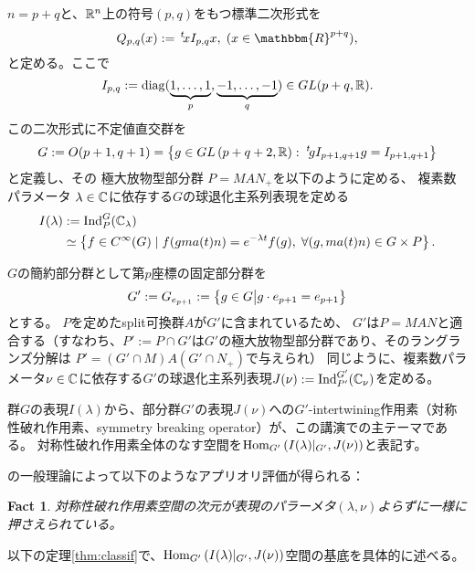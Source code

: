 \documentclass[12pt]{article} %
\newcommand{\assign}{:=}
\newcommand{\tmop}[1]{\ensuremath{\operatorname{#1}}}
\newcommand{\Hom}{\mbox{\normalfont Hom}}
\newcommand{\Ind}{\mbox{\normalfont Ind}}
\newtheorem{fact}{Fact}
\theoremstyle{definition}
\theoremstyle{exampstyle} \newtheorem{examp}[theorem]{Theorem}
\renewcommand{\Q}{Q_{p,q}}
\newcommand{\IlambdaGprime}{I(\lambda)\kern-0.3em\mid_{G'}}
\newcommand{\SBO}{\Hom_{G'}\left(\IlambdaGprime,J(\nu) \right)}
\newcommand{\doubt}[1]{\uwave{#1}}
\begin{document}
  \begin{versiona}
	  $n=p+q$と\doubt{し}、$\mathbb{R}^n$上の符号$(p,q)$をもつ標準二次形式を
	  \begin{equation*}
  \Q (x) \assign \,^t \! x I_{p, q} x, \; (x \in
  \mathbbm{R}^{p + q}),
	  \end{equation*}
	  と定める。ここで
\begin{equation*}
   I_{p, q} \assign \tmop{diag} (\underbrace{1, \ldots, 1}_p, \underbrace{-
  1, \ldots, - 1}_q)\in GL(p+q,\R).
\end{equation*}
この二次形式に\doubt{関する}不定値直交群を
\begin{equation*}
	G \assign O (p +
1, q + 1)=\left\{ g\in GL\left( p+q+2,\R \right):\;^t\!gI_{p+1,q+1}g=I_{p+1,q+1} \right\}
\end{equation*}
と定義し、その
極大放物型部分群
$P=MAN_{+}$を以下のように定める、
複素数パラメータ
$\lambda\in\mathbb{C}$に依存する$G$の球退化主系列表現を定める
\begin{align*}
I(\lambda)&:=\Ind_P^G(\C_\lambda)\\
&\simeq \left\{ f\in C^{\infty}(G)\mid f(gma(t)n)=e^{-\lambda t}f(g),\;\forall(g,ma(t)n)\in G\times P \right\}.
\end{align*}

$G$の簡約部分群として第$p$座標の固定部分群を
\begin{equation*}
	G':=G_{e_{p+1}}:=\left\{g \in G\big| g \cdot e_{p + 1} = e_{p + 1}\right\}
\end{equation*}
とする。
$P$を定めたsplit可換群$A$が$G'$に含まれているため、
$G'$は$P=MAN$と適合する（すなわち、$P':=P\cap G'$は$G'$の極大放物型部分群であり、そのラングランズ分解は
$P'=(G'\cap M)A(G'\cap N_+)$で与えられ\doubt{る}）
同じように、複素数パラメータ$\nu\in\mathbb{C}$に依存する$G'$の球退化主系列表現$J(\nu):=\Ind_{P'}^{G'}(\C_{\nu})$を定める。

群$G$の表現$I(\lambda)$から、部分群$G'$の表現$J(\nu)$への$G'$-intertwining作用素（対称性破れ作用素、symmetry breaking operator）が、この講演での主テーマである。
対称性破れ作用素全体のなす空間を$\SBO$と表記す\doubt{る}。

\cite{kobayashi2013finite,kobayashi2014classification}の一般理論によって以下のようなアプリオリ評価が得られる：
\begin{fact}
	対称性破れ作用素空間の次元が表現のパラーメタ$(\lambda,\nu)$よらずに一様に押さえられている。
\end{fact}
以下の定理\ref{thm:classif}で、$\SBO$空間の基底を具体的に述べる。


\end{versiona}
\end{document}
